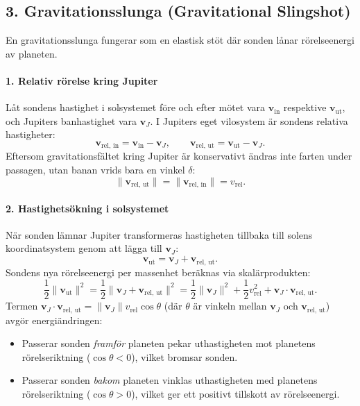 \documentclass{article}
\begin{document}
\subsection*{3. Gravitationsslunga (Gravitational Slingshot)}
En gravitationsslunga fungerar som en elastisk stöt där sonden lånar rörelseenergi av planeten.

\paragraph{1. Relativ rörelse kring Jupiter}
Låt sondens hastighet i solsystemet före och efter mötet vara $\mathbf{v}_{\text{in}}$ respektive $\mathbf{v}_{\text{ut}}$, och Jupiters banhastighet vara $\mathbf{v}_J$. I Jupiters eget vilosystem är sondens relativa hastigheter:
\begin{equation}
    \mathbf{v}_{\text{rel, in}} = \mathbf{v}_{\text{in}} - \mathbf{v}_J, \qquad \mathbf{v}_{\text{rel, ut}} = \mathbf{v}_{\text{ut}} - \mathbf{v}_J.
\end{equation}
Eftersom gravitationsfältet kring Jupiter är konservativt ändras inte farten under passagen, utan banan vrids bara en vinkel $\delta$:
\begin{equation}
    \|\mathbf{v}_{\text{rel, ut}}\| = \|\mathbf{v}_{\text{rel, in}}\| = v_{\text{rel}}.
\end{equation}

\paragraph{2. Hastighetsökning i solsystemet}
När sonden lämnar Jupiter transformeras hastigheten tillbaka till solens koordinatsystem genom att lägga till $\mathbf{v}_J$:
\begin{equation}
    \mathbf{v}_{\text{ut}} = \mathbf{v}_J + \mathbf{v}_{\text{rel, ut}}.
\end{equation}
Sondens nya rörelseenergi per massenhet beräknas via skalärprodukten:
\begin{equation}
    \frac{1}{2}\|\mathbf{v}_{\text{ut}}\|^2 = \frac{1}{2}\|\mathbf{v}_J + \mathbf{v}_{\text{rel, ut}}\|^2 = \frac{1}{2}\|\mathbf{v}_J\|^2 + \frac{1}{2}v_{\text{rel}}^2 + \mathbf{v}_J \cdot \mathbf{v}_{\text{rel, ut}}.
\end{equation}
Termen $\mathbf{v}_J \cdot \mathbf{v}_{\text{rel, ut}} = \|\mathbf{v}_J\| v_{\text{rel}} \cos \theta$ (där $\theta$ är vinkeln mellan $\mathbf{v}_J$ och $\mathbf{v}_{\text{rel, ut}}$) avgör energiändringen:
\begin{itemize} 
    \item Passerar sonden \emph{framför} planeten pekar uthastigheten mot planetens rörelseriktning ($\cos \theta < 0$), vilket bromsar sonden.
    \item Passerar sonden \emph{bakom} planeten vinklas uthastigheten med planetens rörelseriktning ($\cos \theta > 0$), vilket ger ett positivt tillskott av rörelseenergi.
\end{itemize}
\end{document}
